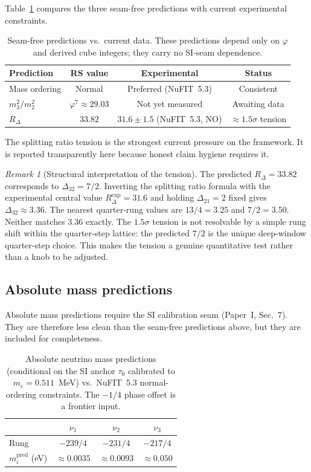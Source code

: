 \documentclass[11pt]{article}
\theoremstyle{remark}
\newtheorem{remark}[theorem]{Remark}
\newcommand{\phig}{\varphi}
\newcommand{\Rdel}{R_\Delta}
\begin{document}
Table~\ref{tab:seam_free} compares the three seam-free
predictions with current experimental constraints.

\begin{table}[h]
\centering
\caption{Seam-free predictions vs.\ current data.  These
predictions depend only on $\phig$ and derived cube integers;
they carry no SI-seam dependence.}
\label{tab:seam_free}
\begin{tabular}{lccc}
\toprule
Prediction & RS value & Experimental & Status \\
\midrule
Mass ordering & Normal & Preferred (NuFIT~5.3) & Consistent \\
$m_3^2/m_2^2$ & $\phig^7\approx 29.03$ & Not yet measured
  & Awaiting data \\
$\Rdel$ & $33.82$ & $31.6\pm 1.5$ (NuFIT~5.3, NO)
  & $\approx 1.5\sigma$ tension \\
\bottomrule
\end{tabular}
\end{table}

The splitting ratio tension is the strongest current pressure
on the framework.  It is reported transparently here because
honest claim hygiene requires it.

\begin{remark}[Structural interpretation of the tension]
The predicted $\Rdel=33.82$ corresponds to $\Delta_{32}=7/2$.
Inverting the splitting ratio formula with the experimental
central value $\Rdel^{\mathrm{exp}}=31.6$ and holding
$\Delta_{21}=2$ fixed gives $\Delta_{32}\approx 3.36$.  The
nearest quarter-rung values are $13/4=3.25$ and $7/2=3.50$.
Neither matches $3.36$ exactly.  The $1.5\sigma$ tension is
not resolvable by a simple rung shift within the quarter-step
lattice: the predicted $7/2$ is the unique deep-window
quarter-step choice.  This makes the tension a genuine
quantitative test rather than a knob to be adjusted.
\end{remark}

\subsection{Absolute mass predictions}

Absolute mass predictions require the SI calibration seam
(Paper~I, Sec.~7).  They are therefore less clean than the
seam-free predictions above, but they are included for
completeness.

\begin{table}[h]
\centering
\caption{Absolute neutrino mass predictions (conditional on
the SI anchor $\tau_0$ calibrated to $m_e=0.511$~MeV) vs.\
NuFIT~5.3 normal-ordering constraints.  The $-1/4$ phase
offset is a frontier input.}
\label{tab:masses}
\begin{tabular}{lccc}
\toprule
& $\nu_1$ & $\nu_2$ & $\nu_3$ \\
\midrule
Rung & $-239/4$ & $-231/4$ & $-217/4$ \\
$m_i^{\mathrm{pred}}$ (eV) & $\approx 0.0035$ & $\approx 0.0093$ &
  $\approx 0.050$ \\
\bottomrule
\end{tabular}
\end{table}
\end{document}
